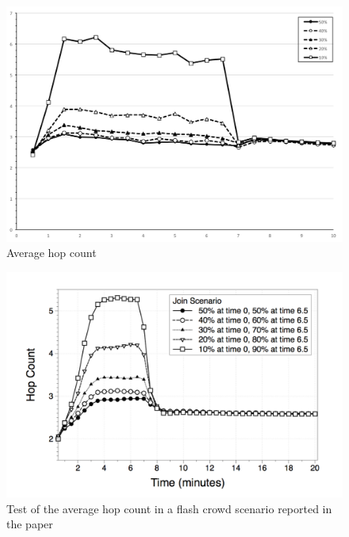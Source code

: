 \begin{figure}[ht]
  \centering
  \includegraphics[keepaspectratio=true, width=\textwidth]{images/average_hop_count_flash_crowd}\caption{Average hop count}
  \label{fig:average_hop_count_flash_crowd}
\end{figure}

\begin{figure}[ht]
  \centering
  \includegraphics[keepaspectratio=true, width=\textwidth]{images/paper_average_hop_count_flash_crowd}\caption{Test of the average hop count in a flash crowd scenario reported in the paper}
  \label{fig:paper_average_hop_count_flash_crowd}
\end{figure}

